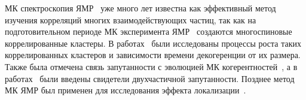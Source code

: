 



МК спектроскопия ЯМР~\cite{Baum1985} уже много лет известна как эффективный метод изучения корреляций многих взаимодействующих частиц,
так как на подготовительном периоде МК эксперимента ЯМР~\cite{Baum1985} создаются многоспиновые коррелированные кластеры.
В работах~\cite{Krojanski2004, Zobov2006, Cho2006, Bochkin2018} были исследованы процессы роста таких коррелированных кластеров и зависимости времени декогеренции от их размера.
Также была отмечена связь запутанности с эволюцией МК когерентностей~\cite{Doronin2003, Furman2008}, %
а в работах~\cite{Feldman2008, Feldman2012} были введены свидетели двухчастичной запутанности.
Позднее метод МК ЯМР был применен для исследования эффекта локализации~\cite{Wei2018}.%


